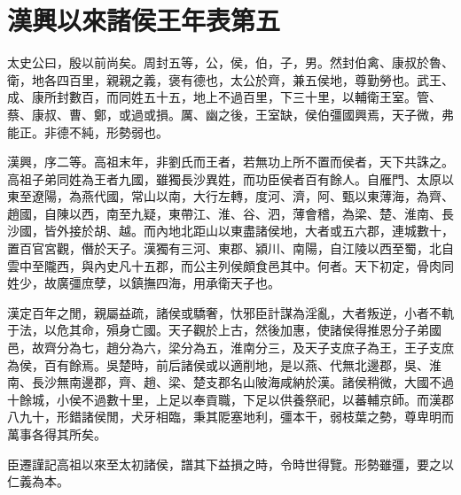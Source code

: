 \chapter{漢興以來諸侯王年表第五}
			
太史公曰，殷以前尚矣。周封五等，公，侯，伯，子，男。然封伯禽、康叔於魯、衛，地各四百里，親親之義，褒有德也，太公於齊，兼五侯地，尊勤勞也。武王、成、康所封數百，而同姓五十五，地上不過百里，下三十里，以輔衛王室。管、蔡、康叔、曹、鄭，或過或損。厲、幽之後，王室缺，侯伯彊國興焉，天子微，弗能正。非德不純，形勢弱也。

漢興，序二等。高祖末年，非劉氏而王者，若無功上所不置而侯者，天下共誅之。高祖子弟同姓為王者九國，雖獨長沙異姓，而功臣侯者百有餘人。自雁門、太原以東至遼陽，為燕代國，常山以南，大行左轉，度河、濟，阿、甄以東薄海，為齊、趙國，自陳以西，南至九疑，東帶江、淮、谷、泗，薄會稽，為梁、楚、淮南、長沙國，皆外接於胡、越。而內地北距山以東盡諸侯地，大者或五六郡，連城數十，置百官宮觀，僭於天子。漢獨有三河、東郡、潁川、南陽，自江陵以西至蜀，北自雲中至隴西，與內史凡十五郡，而公主列侯頗食邑其中。何者。天下初定，骨肉同姓少，故廣彊庶孽，以鎮撫四海，用承衛天子也。

漢定百年之閒，親屬益疏，諸侯或驕奢，忕邪臣計謀為淫亂，大者叛逆，小者不軌于法，以危其命，殞身亡國。天子觀於上古，然後加惠，使諸侯得推恩分子弟國邑，故齊分為七，趙分為六，梁分為五，淮南分三，及天子支庶子為王，王子支庶為侯，百有餘焉。吳楚時，前后諸侯或以適削地，是以燕、代無北邊郡，吳、淮南、長沙無南邊郡，齊、趙、梁、楚支郡名山陂海咸納於漢。諸侯稍微，大國不過十餘城，小侯不過數十里，上足以奉貢職，下足以供養祭祀，以蕃輔京師。而漢郡八九十，形錯諸侯閒，犬牙相臨，秉其阸塞地利，彊本干，弱枝葉之勢，尊卑明而萬事各得其所矣。

臣遷謹記高祖以來至太初諸侯，譜其下益損之時，令時世得覽。形勢雖彊，要之以仁義為本。

